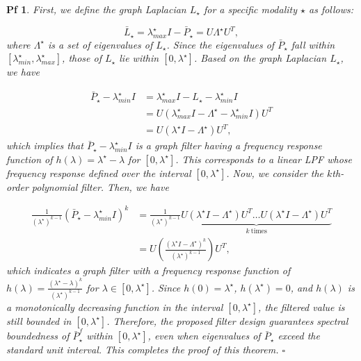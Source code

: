 \documentclass[10pt,a4paper]{amsart}
\newtheorem{pf}{Pf}
\begin{document}
\begin{pf}
    First, we define the graph Laplacian $L_\star$ for a specific modality $\star$ as follows:

    \begin{equation}
        \bar L_\star = \lambda_{max}^\star I - \bar P_\star = U\Lambda^\star U^T,
    \end{equation}
    where $\Lambda^\star$ is a set of eigenvalues of $L_\star$. Since the eigenvalues of $\bar P_\star$ fall within $[\lambda_{min}^\star, \lambda_{max}^\star]$, those of $L_\star$ lie within $[0, \lambda^\star]$. Based on the graph Laplacian $L_\star$, we have

    \begin{equation}
        \begin{aligned}
            \bar P_\star - \lambda^\star_{min}I &= \lambda^\star_{max}I-L_\star - \lambda^\star_{min}I \\ &= U(\lambda^\star_{max}I - \Lambda^\star - \lambda^\star_{min}I)U^T \\ &= U(\lambda^\star I -\Lambda^\star)U^T,
        \end{aligned}
    \end{equation}
    which implies that $\bar P_\star - \lambda^\star_{min}I$ is a graph filter having a frequency response function of $h(\lambda)=\lambda^\star-\lambda$ for $[0, \lambda^\star]$. This corresponds to a linear LPF whose frequency response defined over the interval $[0,\lambda^\star]$. Now, we consider the $k$th-order polynomial filter. Then, we have

    \begin{equation}
        \begin{aligned}
            \frac{1}{(\lambda^\star)^{k-1}}(\bar P_\star-\lambda^\star_{min}I)^k &=\frac{1}{(\lambda^\star)^{k-1}} \underbrace {U (\lambda^\star I-\Lambda^\star) U^T \dots U(\lambda^\star I-\Lambda^\star) U^T}_{k\ \text{times}} \\&=U\left( \frac{(\lambda^\star I -\Lambda^\star)^k}{(\lambda^\star)^{k-1}} \right) U^T,
        \end{aligned}
    \end{equation}
    which indicates a graph filter with a frequency response function of $h(\lambda) = \frac{(\lambda^\star - \lambda)^k}{(\lambda^\star)^{k-1}}$ for $\lambda\in[0, \lambda^\star]$. Since $h(0) = \lambda^\star$, $h(\lambda^\star)=0$, and $h(\lambda)$ is a monotonically decreasing function in the interval $[0, \lambda^\star]$, the filtered value is still bounded in $[0,\lambda^\star]$. Therefore, the proposed filter design guarantees spectral boundedness of $\bar{P}_\star^f$ within $[0, \lambda^\star]$, even when eigenvalues of $\bar{P}_\star$ exceed the standard unit interval. This completes the proof of this theorem.
    \hfill $\square$
\end{pf}
\end{document}
